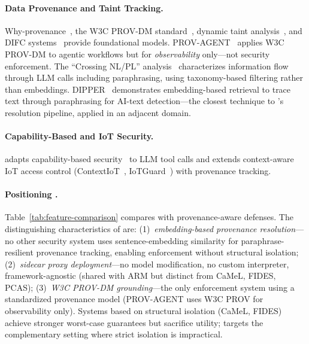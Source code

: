 \paragraph{Data Provenance and Taint Tracking.}
Why-provenance~\cite{buneman2001provenance}, the W3C PROV-DM standard~\cite{prov-dm}, dynamic taint analysis~\cite{taint-analysis-survey,taintdroid}, and DIFC systems~\cite{difc-survey,flume} provide foundational models. PROV-AGENT~\cite{provagent2025} applies W3C PROV-DM to agentic workflows but for \emph{observability} only---not security enforcement. The ``Crossing NL/PL'' analysis~\cite{nlpldivide2026} characterizes information flow through LLM calls including paraphrasing, using taxonomy-based filtering rather than embeddings. DIPPER~\cite{dipper2023} demonstrates embedding-based retrieval to trace text through paraphrasing for AI-text detection---the closest technique to \sys{}'s resolution pipeline, applied in an adjacent domain.

\paragraph{Capability-Based and IoT Security.}
\sys{} adapts capability-based security~\cite{miller2006capability,capsicum} to LLM tool calls and extends context-aware IoT access control (ContextIoT~\cite{jia2017contexiot}, IoTGuard~\cite{iotguard}) with provenance tracking.

\paragraph{Positioning \sys{}.}
Table~\ref{tab:feature-comparison} compares \sys{} with provenance-aware defenses. The distinguishing characteristics of \sys{} are: (1)~\emph{embedding-based provenance resolution}---no other security system uses sentence-embedding similarity for paraphrase-resilient provenance tracking, enabling enforcement without structural isolation; (2)~\emph{sidecar proxy deployment}---no model modification, no custom interpreter, framework-agnostic (shared with ARM but distinct from CaMeL, FIDES, PCAS); (3)~\emph{W3C PROV-DM grounding}---the only enforcement system using a standardized provenance model (PROV-AGENT uses W3C PROV for observability only). Systems based on structural isolation (CaMeL, FIDES) achieve stronger worst-case guarantees but sacrifice utility; \sys{} targets the complementary setting where strict isolation is impractical.

